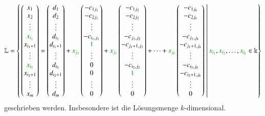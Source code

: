 \[
\mathbb{L}
=
\left\{
\left.
\begin{pmatrix}
x_1\\
x_2\\
\vdots\\
{\color{darkgreen}x_{i_1}}\\
x_{i_1+1}\\
\vdots\\
{\color{darkgreen}x_{i_2}}\\
x_{i_2+1}\\
\vdots\\
x_m
\end{pmatrix}
=
\begin{pmatrix}
d_1\\
d_2\\
\vdots\\
d_{i_1}\\
d_{i_1+1}\\
\vdots\\
d_{i_2}\\
d_{i_2+1}\\
\vdots\\
d_{m}
\end{pmatrix}
+
{\color{darkgreen}x_{j_1}}
\begin{pmatrix}
-c_{1j_1}\\
-c_{2j_1}\\
\vdots\\
-c_{i_1,j_1}\\
{\color{darkgreen}1}\\
\vdots\\
0\\
0\\
\vdots\\
0\\
\end{pmatrix}
+
{\color{darkgreen}x_{j_1}}
\begin{pmatrix}
-c_{1j_2}\\
-c_{2j_2}\\
\vdots\\
-c_{j_1,j_2}\\
-c_{j_1+1,j_2}\\
\vdots\\
-c_{i_2,j_2}\\
{\color{darkgreen}1}\\
\vdots\\
0\\
\end{pmatrix}
+
\dots
+
{\color{darkgreen}x_{j_k}}
\begin{pmatrix}
-c_{1j_k}\\
-c_{2j_k}\\
\vdots\\
-c_{j_1,j_k}\\
-c_{j_1+1,j_k}\\
\vdots\\
-c_{i_2,j_k}\\
-c_{i_2+1,j_k}\\
\vdots\\
0\\
\end{pmatrix}
\;
\right|
{\color{darkgreen}x_{i_1}},{\color{darkgreen}x_{i_2}},\dots,{\color{darkgreen}x_{i_k}}\in\Bbbk
\right\}
\]
geschrieben werden.
Insbesondere ist die Lösungsmenge $k$-dimensional.

